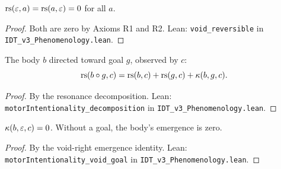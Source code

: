 \begin{theorem}
\label{thm:void-reversible}
$\mathrm{rs}(\varepsilon, a) = \mathrm{rs}(a, \varepsilon) = 0$ for all $a$.
\end{theorem}

\begin{proof}
Both are zero by Axioms R1 and R2.
Lean: \texttt{void\_reversible} in \texttt{IDT\_v3\_Phenomenology.lean}.
\end{proof}

\begin{theorem}
\label{thm:motor-intentionality}
The body $b$ directed toward goal $g$, observed by $c$:
\[
\mathrm{rs}(b \circ g, c) = \mathrm{rs}(b, c) + \mathrm{rs}(g, c) + \kappa(b, g, c).
\]
\end{theorem}

\begin{proof}
By the resonance decomposition.
Lean: \texttt{motorIntentionality\_decomposition} in
\texttt{IDT\_v3\_Phenomenology.lean}.
\end{proof}

\begin{theorem}
\label{thm:void-goal}
$\kappa(b, \varepsilon, c) = 0$. Without a goal, the body's emergence is zero.
\end{theorem}

\begin{proof}
By the void-right emergence identity.
Lean: \texttt{motorIntentionality\_void\_goal} in
\texttt{IDT\_v3\_Phenomenology.lean}.
\end{proof}

